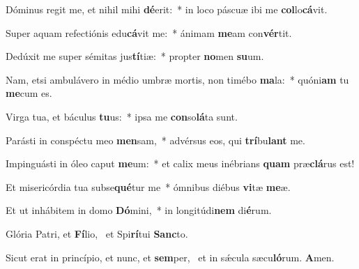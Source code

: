 \item Dóminus regit me, et nihil mihi \textbf{dé}erit:~* in loco páscuæ ibi me \textbf{col}lo\textbf{cá}vit.
\item Super aquam refectiónis edu\textbf{cá}vit me:~* ánimam \textbf{me}am con\textbf{vér}tit.
\item Dedúxit me super sémitas jus\textbf{tí}tiæ:~* propter \textbf{no}men \textbf{su}um.
\item Nam, etsi ambulávero in médio umbræ mortis, non timébo \textbf{ma}la:~* quóni\textbf{am} tu \textbf{me}cum es.
\item Virga tua, et báculus \textbf{tu}us:~* ipsa me \textbf{con}so\textbf{lá}ta sunt.
\item Parásti in conspéctu meo \textbf{men}sam,~* advérsus eos, qui \textbf{trí}bu\textbf{lant} me.
\item Impinguásti in óleo caput \textbf{me}um:~* et calix meus inébrians \textbf{quam} præ\textbf{clá}rus est!
\item Et misericórdia tua subse\textbf{qué}\-tur me~* ómnibus diébus \textbf{vi}tæ \textbf{me}æ.
\item Et ut inhábitem in domo \textbf{Dó}mini,~* in longitúdi\textbf{nem} di\textbf{é}rum.
\item Glória Patri, et \textbf{Fí}lio,~\psstar{} et Spi\textbf{rí}tui \textbf{Sanc}to.
\item Sicut erat in princípio, et nunc, et \textbf{sem}per,~\psstar{} et in sǽcula sæcu\textbf{ló}rum. \textbf{A}men.
